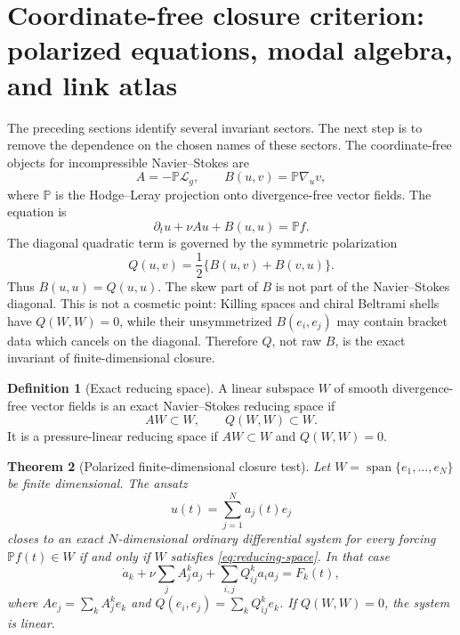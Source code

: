 \documentclass[aps,prd,reprint,superscriptaddress,nofootinbib,floatfix]{revtex4-2}
\newtheorem{theorem}{Theorem}
\theoremstyle{definition}
\newtheorem{definition}[theorem]{Definition}
\theoremstyle{remark}
\newcommand{\PP}{\mathbb{P}}
\begin{document}
\section{Coordinate-free closure criterion: polarized equations, modal algebra, and link atlas}
\label{sec:coordinate-free closure}

The preceding sections identify several invariant sectors.  The next step is to remove the dependence on the chosen names of these sectors.  The coordinate-free objects for incompressible Navier--Stokes are
\begin{equation}
	A=-\PP\mathcal L_g,\qquad
	B(u,v)=\PP\nabla_u v ,
	\label{eq:leray-stokes-pair}
\end{equation}
where \(\PP\) is the Hodge--Leray projection onto divergence-free vector fields.  The equation is
\begin{equation}
	\partial_tu+\nu Au+B(u,u)=\PP f.
	\label{eq:projected-ns}
\end{equation}
The diagonal quadratic term is governed by the symmetric polarization
\begin{equation}
	Q(u,v)=\frac12\{B(u,v)+B(v,u)\}.
	\label{eq:polarized-Q}
\end{equation}
Thus \(B(u,u)=Q(u,u)\).  The skew part of \(B\) is not part of the Navier--Stokes diagonal.  This is not a cosmetic point: Killing spaces and chiral Beltrami shells have \(Q(W,W)=0\), while their unsymmetrized \(B(e_i,e_j)\) may contain bracket data which cancels on the diagonal.  Therefore \(Q\), not raw \(B\), is the exact invariant of finite-dimensional closure.

\begin{definition}[Exact reducing space]
	A linear subspace \(W\) of smooth divergence-free vector fields is an exact Navier--Stokes reducing space if
	\begin{equation}
		AW\subset W,\qquad Q(W,W)\subset W.
		\label{eq:reducing-space}
	\end{equation}
	It is a pressure-linear reducing space if \(AW\subset W\) and \(Q(W,W)=0\).
\end{definition}

\begin{theorem}[Polarized finite-dimensional closure test]\label{thm:polarizedclosure}
	Let \(W=\operatorname{span}\{e_1,\dots,e_N\}\) be finite dimensional.  The ansatz
	\[
		u(t)=\sum_{j=1}^N a_j(t)e_j
	\]
	closes to an exact \(N\)-dimensional ordinary differential system for every forcing \(\PP f(t)\in W\) if and only if \(W\) satisfies \eqref{eq:reducing-space}.  In that case
	\[
		\dot a_k+\nu\sum_j A^k_j a_j+\sum_{i,j}Q^k_{ij}a_i a_j=F_k(t),
	\]
	where \(Ae_j=\sum_k A^k_j e_k\) and \(Q(e_i,e_j)=\sum_k Q^k_{ij}e_k\).  If \(Q(W,W)=0\), the system is linear.
\end{theorem}
\end{document}
